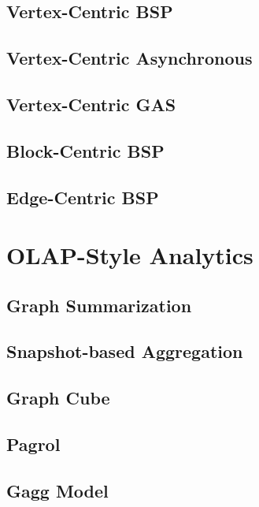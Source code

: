 \documentclass[table,xcolor=pdftex,dvipsnames]{beamer}
\begin{document}
    \subsection{Vertex-Centric BSP}
    \subsection{Vertex-Centric Asynchronous}
    \subsection{Vertex-Centric GAS}
    \subsection{Block-Centric BSP}
    \subsection{Edge-Centric BSP}
\begin{frame}\end{frame}

\section{OLAP-Style Analytics}
    \subsection{Graph Summarization}
    \subsection{Snapshot-based Aggregation}
    \subsection{Graph Cube}
    \subsection{Pagrol}
    \subsection{Gagg Model}
\begin{frame}\end{frame}
\end{document}
